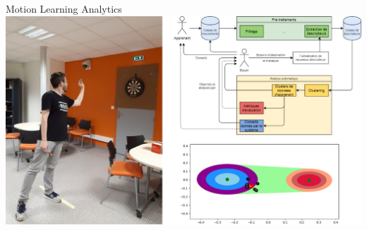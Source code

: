 \documentclass[svgnames]{beamer}
\begin{document}
	\begin{frame}{Motion Learning Analytics}
		\centering
		\includegraphics[scale=1.15]{img/resume.png}
	\end{frame}
\end{document}
